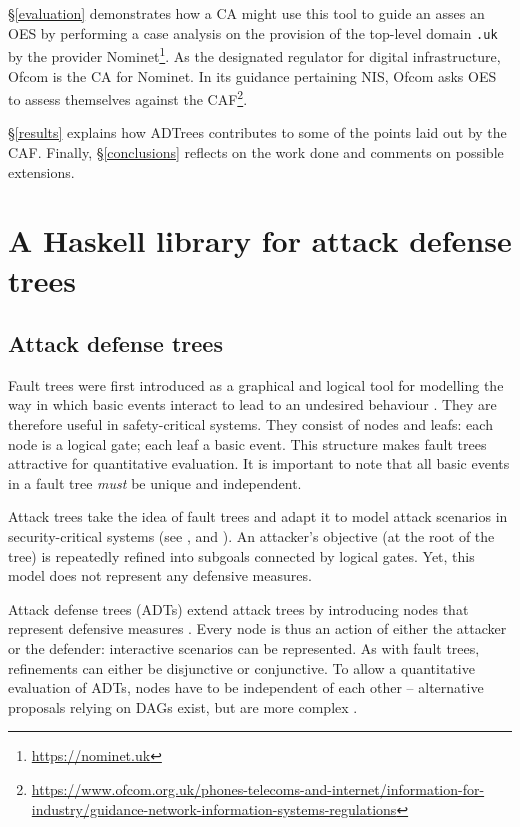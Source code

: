 \documentclass{scrreprt}
\begin{document}
\S\ref{evaluation} demonstrates how a CA might use this tool to guide an asses
an OES by performing a case analysis on the provision of the top-level domain
\texttt{.uk} by the provider Nominet\footnote{\url{https://nominet.uk}}. As the
designated regulator for digital infrastructure, Ofcom is the CA for Nominet. In
its guidance pertaining NIS, Ofcom asks OES to assess themselves against the
CAF\footnote{\url{https://www.ofcom.org.uk/phones-telecoms-and-internet/information-for-industry/guidance-network-information-systems-regulations}}.

\S\ref{results} explains how ADTrees contributes to some of the points laid out
by the CAF. Finally, \S\ref{conclusions} reflects on the work done and comments
on possible extensions.

\chapter{A Haskell library for attack defense trees}
\label{tool}

\section{Attack defense trees}

Fault trees were first introduced as a graphical and logical tool for modelling
the way in which basic events interact to lead to an undesired behaviour
\cite[IV.1]{Vesely1981}. They are therefore useful in safety-critical systems.
They consist of nodes and leafs: each node is a logical gate; each leaf a basic
event. This structure makes fault trees attractive for quantitative evaluation.
It is important to note that all basic events in a fault tree \textit{must} be
unique and independent. 

Attack trees take the idea of fault trees and adapt it to model attack scenarios
in security-critical systems (see \cite{Schneier1999}, \cite{Brooke2003} and
\cite{NaiFovino2009}). An attacker's objective (at the root of the tree) is
repeatedly refined into subgoals connected by logical gates. Yet, this model
does not represent any defensive measures.

Attack defense trees (ADTs) extend attack trees by introducing nodes that
represent defensive measures \cite{KordyFoundations}. Every node is thus an
action of either the attacker or the defender: interactive scenarios can be
represented.  As with fault trees, refinements can either be disjunctive or
conjunctive. To allow a quantitative evaluation of ADTs, nodes have to be
independent of each other -- alternative proposals relying on DAGs exist, but
are more complex \cite{KordyDAG}.
\end{document}
